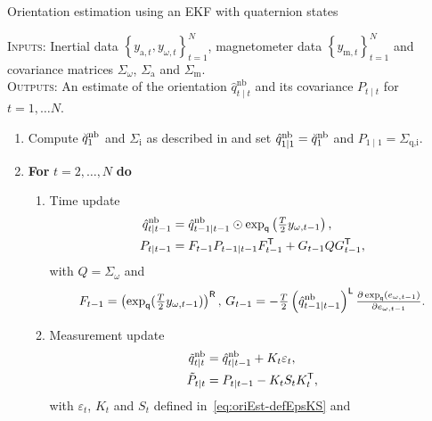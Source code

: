 \begin{algorithm}[ht]
\caption{\textsf{Orientation estimation using an EKF with quaternion states}}
\label{alg:oriEst-ekfQuat}
\small
\textsc{Inputs:} Inertial data $\left\{ y_{\text{a},t}, y_{\omega,t} \right\}_{t=1}^N$, magnetometer data $\left\{ y_{\text{m},t}\right\}_{t=1}^N$ and covariance matrices $\Sigma_\omega$, $\Sigma_\text{a}$ and $\Sigma_\text{m}$. \\
\textsc{Outputs:} An estimate of the orientation $\hat{q}^\text{nb}_{t \mid t}$ and its covariance $P_{t \mid t}$ for $t = 1, \hdots N$.
\algrule[.4pt]
\begin{enumerate}
\item Compute $\breve{q}^\text{nb}_{1}$ and $\Sigma_\text{i}$ as described in  and set $\hat{q}_{1 \mid 1}^\text{nb} = \breve{q}_{1}^\text{nb}$ and $P_{1 \mid 1} = \Sigma_\text{q,i}$.
\item \textbf{For} $t = 2, \hdots, N$ \textbf{do}
\begin{enumerate}
\item Time update
\begin{subequations}
\begin{align}
\hat{q}^\text{nb}_{t \mid t-1} &= \hat{q}^\text{nb}_{t-1 \mid t-1} \odot \expq \left( \tfrac{T}{2} y_{\omega,t-1} \right), \\
P_{t \mid t-1} &= F_{t-1} P_{t-1 \mid t-1} F_{t-1}^\Transp + G_{t-1} Q G_{t-1}^\Transp, \label{eq:quatEKF_TPupdate} %
\end{align}%
\label{eq:ori_qEkf_timeUpdate}%
\end{subequations}%
with $Q = \Sigma_\omega$ and 
\begin{align*}
F_{t-1} = \left( \exp_\mathsf{q} (\tfrac{T}{2} y_{\omega,t-1}) \right)^{\mathsf{R}}, \, G_{t-1} = -\tfrac{T}{2} \left( \hat{q}^{\text{nb}}_{t-1 \mid t-1} \right)^{\mathsf{L}} \tfrac{\partial \exp_\mathsf{q} (e_{\omega,t-1})}{\partial e_{\omega,t-1}}.
\end{align*}
\item Measurement update
\begin{subequations}
\begin{align}
\tilde{q}^\text{nb}_{t \mid t} &= \hat{q}^\text{nb}_{t \mid t-1} + K_t \varepsilon_t,  \\
\tilde{P}_{t \mid t} &= P_{t \mid t-1} - K_t S_t K_t^{\mathsf{T}}, 
\end{align}
\label{eq:ori_qEkf_measUpdate}
\end{subequations}%
with $\varepsilon_t$, $K_t$ and $S_t$ defined in~\eqref{eq:oriEst-defEpsKS} and

\end{enumerate}
\end{enumerate}
\end{algorithm}
